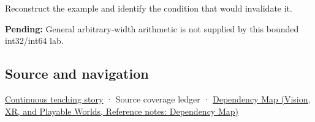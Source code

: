 Reconstruct the example and identify the condition that would invalidate it.

\textbf{Pending:} General arbitrary-width arithmetic is not supplied by this bounded int32/int64 lab.

\subsection{Source and navigation}\label{appendix-3333db47830f-source-and-navigation}

\hyperref[01-foundations-i-ch001-choosing-what-information-to-keep]{Continuous teaching story} · {Source coverage ledger} · \href{../07-Vision-XR-and-Playable-Worlds/main.pdf\#nameddest=appendix-4ad47bdd269a}{Dependency Map (Vision, XR, and Playable Worlds, Reference notes: Dependency Map)}
